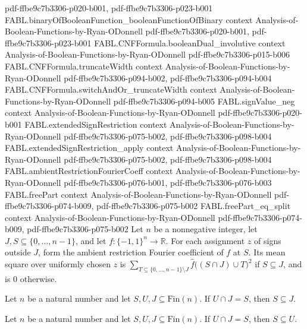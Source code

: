 \begin{theorem}
  {pdf-ffbe9c7b3306-p020-b001,
    pdf-ffbe9c7b3306-p023-b001}
\proofstep
  {FABL.binaryOfBooleanFunction_booleanFunctionOfBinary}
  {context}
  {Analysis-of-Boolean-Functions-by-Ryan-ODonnell}
  {pdf-ffbe9c7b3306-p020-b001,
    pdf-ffbe9c7b3306-p023-b001}
\proofstep
  {FABL.CNFFormula.booleanDual_involutive}
  {context}
  {Analysis-of-Boolean-Functions-by-Ryan-ODonnell}
  {pdf-ffbe9c7b3306-p015-b006}
\proofstep
  {FABL.CNFFormula.truncateWidth}
  {context}
  {Analysis-of-Boolean-Functions-by-Ryan-ODonnell}
  {pdf-ffbe9c7b3306-p094-b002,
    pdf-ffbe9c7b3306-p094-b004}
\proofstep
  {FABL.CNFFormula.switchAndOr_truncateWidth}
  {context}
  {Analysis-of-Boolean-Functions-by-Ryan-ODonnell}
  {pdf-ffbe9c7b3306-p094-b005}
\proofstep
  {FABL.signValue_neg}
  {context}
  {Analysis-of-Boolean-Functions-by-Ryan-ODonnell}
  {pdf-ffbe9c7b3306-p020-b001}
\proofstep
  {FABL.extendedSignRestriction}
  {context}
  {Analysis-of-Boolean-Functions-by-Ryan-ODonnell}
  {pdf-ffbe9c7b3306-p075-b002,
    pdf-ffbe9c7b3306-p098-b004}
\proofstep
  {FABL.extendedSignRestriction_apply}
  {context}
  {Analysis-of-Boolean-Functions-by-Ryan-ODonnell}
  {pdf-ffbe9c7b3306-p075-b002,
    pdf-ffbe9c7b3306-p098-b004}
\proofstep
  {FABL.ambientRestrictionFourierCoeff}
  {context}
  {Analysis-of-Boolean-Functions-by-Ryan-ODonnell}
  {pdf-ffbe9c7b3306-p076-b001,
    pdf-ffbe9c7b3306-p076-b003}
\proofstep
  {FABL.freePart}
  {context}
  {Analysis-of-Boolean-Functions-by-Ryan-ODonnell}
  {pdf-ffbe9c7b3306-p074-b009,
    pdf-ffbe9c7b3306-p075-b002}
\proofstep
  {FABL.freePart_eq_split}
  {context}
  {Analysis-of-Boolean-Functions-by-Ryan-ODonnell}
  {pdf-ffbe9c7b3306-p074-b009,
    pdf-ffbe9c7b3306-p075-b002}
Let $n$ be a nonnegative integer, let $J,S\subseteq\{0,\ldots,n-1\}$, and let
$f:\{-1,1\}^n\to\mathbb R$. For each assignment $z$ of signs outside $J$, form the
ambient restriction Fourier coefficient of $f$ at $S$. Its mean square over uniformly
chosen $z$ is $\sum_{T\subseteq\{0,\ldots,n-1\}\setminus J}\widehat f\bigl((S\cap J)\cup
T\bigr)^2$ if $S\subseteq J$, and is $0$ otherwise.
\end{theorem}

\begin{theorem}
\label{FABL.subset_of_inter_eq}
\leanok
{}
Let $n$ be a natural number and let $S,U,J\subseteq\mathrm{Fin}(n)$. If $U\cap J=S$,
then $S\subseteq J$.
\end{theorem}

\begin{theorem}
\label{FABL.subset_of_inter_eq_left}
\leanok
{}
Let $n$ be a natural number and let $S,U,J\subseteq\mathrm{Fin}(n)$. If $U\cap J=S$,
then $S\subseteq U$.
\end{theorem}

